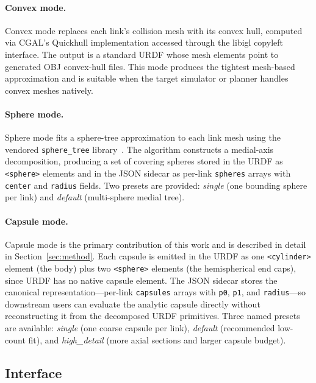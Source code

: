 \paragraph{Convex mode.}
Convex mode replaces each link's collision mesh with its convex hull, computed via CGAL's Quickhull implementation accessed through the libigl copyleft interface.
The output is a standard URDF whose mesh elements point to generated OBJ convex-hull files.
This mode produces the tightest mesh-based approximation and is suitable when the target simulator or planner handles convex meshes natively.

\paragraph{Sphere mode.}
Sphere mode fits a sphere-tree approximation to each link mesh using the vendored \texttt{sphere\_tree} library~\cite{mlund_spheretree}.
The algorithm constructs a medial-axis decomposition, producing a set of covering spheres stored in the URDF as \texttt{<sphere>} elements and in the JSON sidecar as per-link \texttt{spheres} arrays with \texttt{center} and \texttt{radius} fields.
Two presets are provided: \emph{single} (one bounding sphere per link) and \emph{default} (multi-sphere medial tree).

\paragraph{Capsule mode.}
Capsule mode is the primary contribution of this work and is described in detail in Section~\ref{sec:method}.
Each capsule is emitted in the URDF as one \texttt{<cylinder>} element (the body) plus two \texttt{<sphere>} elements (the hemispherical end caps), since URDF has no native capsule element.
The JSON sidecar stores the canonical representation---per-link \texttt{capsules} arrays with \texttt{p0}, \texttt{p1}, and \texttt{radius}---so downstream users can evaluate the analytic capsule directly without reconstructing it from the decomposed URDF primitives.
Three named presets are available: \emph{single} (one coarse capsule per link), \emph{default} (recommended low-count fit), and \emph{high\_detail} (more axial sections and larger capsule budget).

\subsection{Interface}

